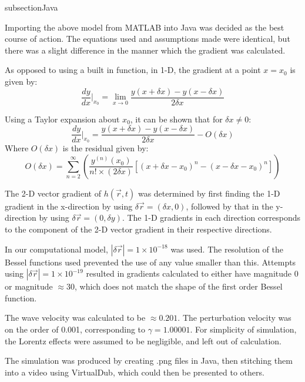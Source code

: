 subsection{Java}

Importing the above model from MATLAB into Java was decided as the best course of action. The equations used and assumptions made were identical, but there was a slight difference in the manner which the gradient was calculated.

As opposed to using a built in function, in 1-D, the gradient at a point $x = x_0$ is given by:
\begin{equation} \frac{dy}{dx}\Bigr|_{x_0} = \lim_{x\to0} \frac{y(x+\delta x)-y(x-\delta x)}{2\delta x}\end{equation}

Using a Taylor expansion about $x_0$, it can be shown that for $\delta x\neq 0$:
\begin{equation} \frac{dy}{dx}\Bigr|_{x_0} = \frac{y(x+\delta x) - y(x-\delta x)}{2\delta x} - O(\delta x)\end{equation}
Where $O(\delta x)$ is the residual given by:
\begin{equation}O(\delta x) = \sum_{n=2}^{\infty} \left( \frac{y^{(n)}(x_0)}{n!\times (2\delta x)} \left[ \left( x+\delta x -x_0 \right)^n - \left(x-\delta x -x_0 \right)^n \right] \right)\end{equation}

The 2-D vector gradient of $h(\vec{r} , t)$ was determined by first finding the 1-D gradient in the x-direction by using $\delta \vec{r} = (\delta x,0)$, followed by that in the y-direction by using $\delta \vec{r} = (0,\delta y)$. The 1-D gradients in each direction corresponds to the component of the 2-D vector gradient in their respective directions. 

In our computational model, $|\delta \vec{r}| = 1\times 10^{-18}$ was used. The resolution of the Bessel functions used prevented the use of any value smaller than this. Attempts using $|\delta \vec{r}| = 1\times 10^{-19}$ resulted in gradients calculated to either have magnitude 0 or magnitude $\approx 30$, which does not match the shape of the first order Bessel function.

The wave velocity was calculated to be $\approx 0.201$. The perturbation velocity was on the order of 0.001, corresponding to $\gamma = 1.00001$. For simplicity of simulation, the Lorentz effects were assumed to be negligible, and left out of calculation.

The simulation was produced by creating .png files in Java, then stitching them into a video using VirtualDub, which could then be presented to others.


